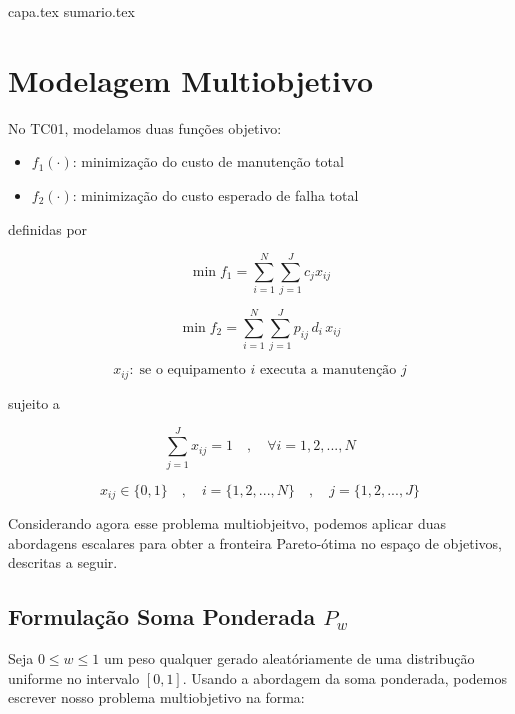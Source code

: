 \documentclass[
	12pt,				%
	oneside,			%
	a4paper,			%
	chapter=TITLE,
	sumario=tradicional,
	english,			%
	brazil				%
]{abntex2}
\newcommand{\un}[1]{\;\text{#1}}
\begin{document}

\frenchspacing 

{capa.tex}
{sumario.tex}

\textual

\pagestyle{simple}

\chapter{Modelagem Multiobjetivo}\label{cap:modelagem} 

No TC01, modelamos duas funções objetivo:

\begin{itemize}
	\item $f_1 (\cdot)$: minimização do custo de manutenção total 
	\item $f_2 (\cdot)$: minimização do custo esperado de falha total
\end{itemize}

\noindent definidas por 

\[  \min f_1 = \sum_{i=1}^{N} \sum_{j=1}^{J} c_j x_{ij} \]

\[  \min f_2 = \sum_{i=1}^{N} \sum_{j=1}^{J} p_{ij} \, d_i \, x_{ij} \]

\[  x_{ij}: \un{se o equipamento $i$ executa a manutenção $j$}  \]

\noindent sujeito a

\[ \sum_{j=1}^{J} x_{ij} = 1 \quad , \quad \forall i = {1, 2, ..., N} \]

\[ x_{ij} \in \{0,1\} \quad , \quad i = \{1, 2, ..., N\}  \quad , \quad j = \{1, 2, ..., J\} \]

Considerando agora esse problema multiobjeitvo, podemos aplicar duas abordagens escalares 
para obter a fronteira Pareto-ótima no espaço de objetivos, descritas a seguir.

\section{Formulação Soma Ponderada $P_{w}$}

Seja $0 \leq w \leq 1$ um peso qualquer gerado aleatóriamente de uma distribução 
uniforme no intervalo $[0, 1]$. Usando a abordagem da soma ponderada, podemos escrever nosso problema 
multiobjetivo na forma: 
\end{document}
